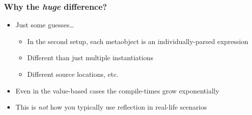 \documentclass[compress,table,xcolor=table]{beamer}
\begin{document}
\begin{frame}
  \frametitle{Why the {\em \larger huge} difference?}
  \Large
  \begin{itemize}
    \item Just some guesses\ldots
    \begin{itemize}
      \smaller
      \item In the second setup, each metaobject is an individually-parsed expression
      \item Different than just multiple instantiations
      \item Different source locations, etc.
    \end{itemize}
    \item Even in the value-based cases the compile-times grow exponentially
    \item This is {\em \larger not} how you typically use reflection
      in real-life scenarios
  \end{itemize}
\end{frame}
\end{document}

